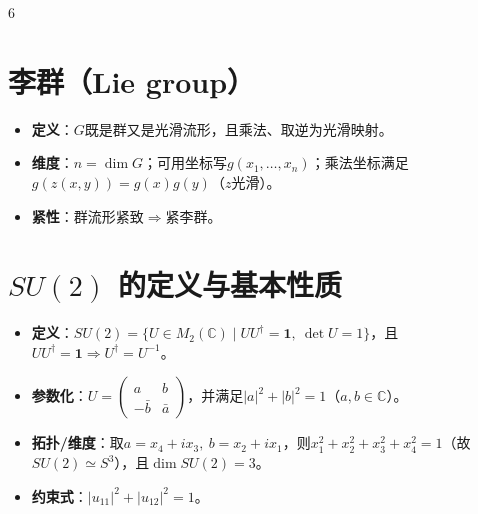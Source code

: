 \documentclass[landscape]{article}
\begin{document}
\begin{multicols*}{6}
\section*{李群（Lie group）}
\begin{itemize}
  \item \textbf{定义}：$G$既是群又是光滑流形，且乘法、取逆为光滑映射。
  \item \textbf{维度}：$n=\dim G$；可用坐标写$g(x_1,\dots,x_n)$；乘法坐标满足$g(z(x,y))=g(x)g(y)$（$z$光滑）。
  \item \textbf{紧性}：群流形紧致$\Rightarrow$紧李群。
\end{itemize}

\section*{$SU(2)$ 的定义与基本性质}
\begin{itemize}
  \item \textbf{定义}：$SU(2)=\{U\in M_{2}(\mathbb{C})\mid UU^{\dagger}=\mathbf{1},\ \det U=1\}$，且$UU^{\dagger}=\mathbf{1}\Rightarrow U^{\dagger}=U^{-1}$。
  \item \textbf{参数化}：$U=\begin{pmatrix} a & b \\ -\bar b & \bar a \end{pmatrix}$，并满足$|a|^2+|b|^2=1$（$a,b\in\mathbb{C}$）。
  \item \textbf{拓扑/维度}：取$a=x_4+i x_3,\ b=x_2+i x_1$，则$x_1^2+x_2^2+x_3^2+x_4^2=1$（故$SU(2)\simeq S^3$），且$\dim SU(2)=3$。
  \item \textbf{约束式}：$|u_{11}|^2+|u_{12}|^2=1$。
\end{itemize}


\end{multicols*}
\end{document}
